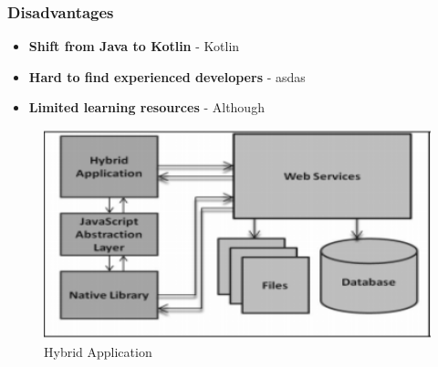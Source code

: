 \subsubsection{Disadvantages}
\begin{itemize}
    \item \textbf{Shift from Java to Kotlin} - Kotlin
    \item \textbf{Hard to find experienced developers} - asdas
    \item \textbf{Limited learning resources} - Although
\end{itemize}

\begin{figure}[h!]
	\caption{Hybrid Application}
	\label{image:myImageName}
	\centering
	\includegraphics[width=1\textwidth]{Images/hybrid_dev_img.PNG}
\end{figure}

